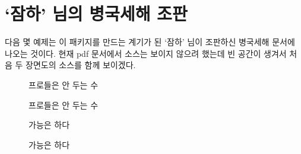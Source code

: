 \documentclass[figtabcapt,a4paper]{oblivoir}
\begin{document}
\section{`잠하' 님의 병국세해 조판}

\renewcommand\figurename{장면도}
\setcounter{figure}{0}

다음 몇 예제는 이 패키지를 만드는 계기가 된 `잠하' 님이 조판하신 병국세해 문서에 나오는 것이다.
현재 pdf 문서에서 소스는 보이지 않으려 했는데 빈 공간이 생겨서 처음 두 장면도의 소스를 함께 보이겠다.

\ClearHistory

\begin{figure}[!h]
\centering
\caption{프로들은 안 두는 수}
\begin{ksbadukpan}
\end{ksbadukpan}
\end{figure}

\begin{boxedverbatim}
\renewcommand\figurename{장면도}

\begin{figure}[!h]
\centering
\caption{프로들은 안 두는 수}
\begin{ksbadukpan}
\end{ksbadukpan}
\end{figure}
\end{boxedverbatim}

\begin{figure}[!h]
\centering
\caption{가능은 하다}
\begin{ksbadukpan}[posmark]
\KSBadukContinue
{}
\end{ksbadukpan}
\end{figure}

\begin{boxedverbatim}
\begin{figure}[!h]
\centering
\caption{가능은 하다}
\begin{ksbadukpan}[posmark]
\KSBadukContinue
{}
\end{ksbadukpan}
\end{figure}
\end{boxedverbatim}
\end{document}

